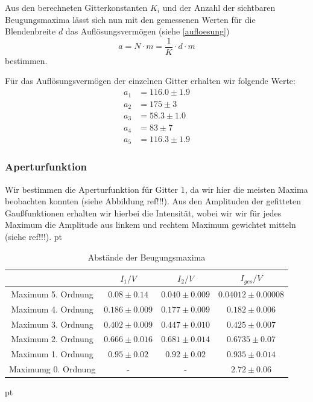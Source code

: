 \documentclass[12pt]{article}
\begin{document}
Aus den berechneten Gitterkonstanten $K_i$ und der Anzahl der sichtbaren Beugungsmaxima lässt sich nun mit den gemessenen Werten für die Blendenbreite $d$ das Auflösungsvermögen (siehe \ref{aufloesung}) $$a=N\cdot m=\frac1K\cdot d\cdot m$$ bestimmen.

Für das Auflösungsvermögen der einzelnen Gitter erhalten wir folgende Werte:
\begin{align}
	a_1&=116.0\pm1.9\\
	a_2&=175\pm3\\
	a_3&=58.3\pm1.0\\
	a_4&=83\pm7\\
	a_5&=116.3\pm1.9
\end{align}

\subsubsection{Aperturfunktion}


Wir bestimmen die Aperturfunktion für Gitter 1, da wir hier die meisten Maxima beobachten konnten (siehe Abbildung ref!!!).
Aus den Amplituden der gefitteten  Gaußfunktionen erhalten wir hierbei die Intensität, wobei wir wir für jedes Maximum die Amplitude aus linkem und rechtem Maximum gewichtet mitteln (siehe ref!!!). 
  pt
 \begin{table}[h!]
 {\centering
\begin{tabular}{c||c|c|c}
 					& $I_1/V$ 	& $I_2/V$ & $I_{ges}/V$	\\ \hline\hline
Maximum 5. Ordnung     & $0.08 \pm 0.14$  & $0.040 \pm 0.009$      &  $0.04012 \pm  0.00008$                       \\ \hline
Maximum 4. Ordnung		& $0.186 \pm 0.009$ 	&  $0.177 \pm 0.009$    	&  $0.182 \pm 0.006$ \\ \hline 
Maximum 3. Ordnung	&	 $0.402 \pm 0.009$ 	   	&  $0.447 \pm 0.010$  	&  $0.425 \pm 0.007$  \\ \hline
Maximum 2. Ordnung    & $0.666 \pm 0.016$ & $0.681 \pm 0.014$ &   $0.6735 \pm 0.07$        \\ \hline                                           
Maximum 1. Ordnung      	&  $0.95 \pm 0.02$  	&  $0.92 \pm 0.02$  &  $0.935 \pm 0.014$  \\ \hline

Maximumg 0. Ordnung  & -  & - & $2.72 \pm 0.06$
 \end{tabular}
 \caption{Abstände der Beugungsmaxima}}
\end{table}
 pt
\end{document}
